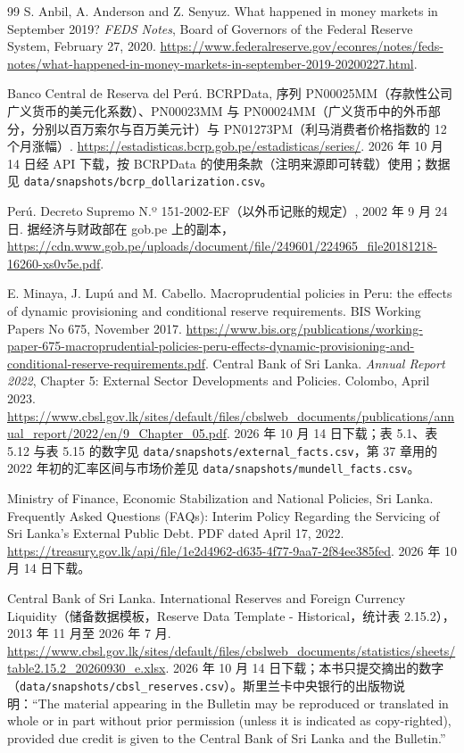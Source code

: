 \begin{thebibliography}{99}
 S. Anbil, A. Anderson and Z. Senyuz. What happened in money markets in September 2019? \emph{FEDS Notes}, Board of Governors of the Federal Reserve System, February 27, 2020. \url{https://www.federalreserve.gov/econres/notes/feds-notes/what-happened-in-money-markets-in-september-2019-20200227.html}.

 Banco Central de Reserva del Perú. BCRPData, 序列 PN00025MM（存款性公司广义货币的美元化系数）、PN00023MM 与 PN00024MM（广义货币中的外币部分，分别以百万索尔与百万美元计）与 PN01273PM（利马消费者价格指数的 12 个月涨幅）. \url{https://estadisticas.bcrp.gob.pe/estadisticas/series/}. 2026 年 10 月 14 日经 API 下载，按 BCRPData 的使用条款（注明来源即可转载）使用；数据见 \texttt{data/snapshots/bcrp\_dollarization.csv}。

 Perú. Decreto Supremo N.º 151-2002-EF（以外币记账的规定）, 2002 年 9 月 24 日. 据经济与财政部在 gob.pe 上的副本，\url{https://cdn.www.gob.pe/uploads/document/file/249601/224965_file20181218-16260-xs0v5e.pdf}.

 E. Minaya, J. Lupú and M. Cabello. Macroprudential policies in Peru: the effects of dynamic provisioning and conditional reserve requirements. BIS Working Papers No 675, November 2017. \url{https://www.bis.org/publications/working-paper-675-macroprudential-policies-peru-effects-dynamic-provisioning-and-conditional-reserve-requirements.pdf}.
 Central Bank of Sri Lanka. \emph{Annual Report 2022}, Chapter 5: External Sector Developments and Policies. Colombo, April 2023. \url{https://www.cbsl.gov.lk/sites/default/files/cbslweb_documents/publications/annual_report/2022/en/9_Chapter_05.pdf}. 2026 年 10 月 14 日下载；表 5.1、表 5.12 与表 5.15 的数字见 \texttt{data/snapshots/external\_facts.csv}，第 37 章用的 2022 年初的汇率区间与市场价差见 \texttt{data/snapshots/mundell\_facts.csv}。

 Ministry of Finance, Economic Stabilization and National Policies, Sri Lanka. Frequently Asked Questions (FAQs): Interim Policy Regarding the Servicing of Sri Lanka's External Public Debt. PDF dated April 17, 2022. \url{https://treasury.gov.lk/api/file/1e2d4962-d635-4f77-9aa7-2f84ee385fed}. 2026 年 10 月 14 日下载。

 Central Bank of Sri Lanka. International Reserves and Foreign Currency Liquidity（储备数据模板，Reserve Data Template - Historical，统计表 2.15.2），2013 年 11 月至 2026 年 7 月. \url{https://www.cbsl.gov.lk/sites/default/files/cbslweb_documents/statistics/sheets/table2.15.2_20260930_e.xlsx}. 2026 年 10 月 14 日下载；本书只提交摘出的数字（\texttt{data/snapshots/cbsl\_reserves.csv}）。斯里兰卡中央银行的出版物说明：“The material appearing in the Bulletin may be reproduced or translated in whole or in part without prior permission (unless it is indicated as copy-righted), provided due credit is given to the Central Bank of Sri Lanka and the Bulletin.”


\end{thebibliography}
